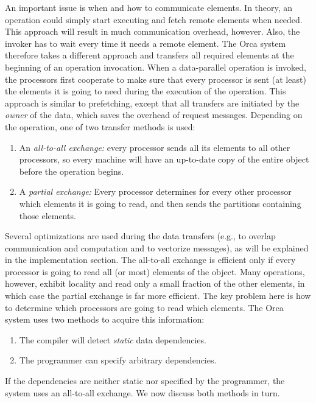 \documentclass{acmtrans2e}
\begin{document}
An important issue is when and how to communicate elements.
In theory, an operation could simply start executing and
fetch remote elements when needed. This approach will
result in much communication overhead, however.
Also, the invoker has to wait every time it needs a remote element.
The Orca system therefore takes a different approach and transfers
all required elements at the beginning of an operation invocation.
When a data-parallel operation is invoked, the processors first cooperate 
to make sure that every processor is sent (at least) the elements it 
is going to need during the execution of the operation.
This approach is similar to prefetching, except that
all transfers are initiated by the \emph{owner} of the data,
which saves the overhead of request messages.
Depending on the operation, one of two transfer methods is used:


\begin{enumerate}
\item An \emph{all-to-all exchange:} every processor sends all its elements
to all other processors,
so every machine will have an up-to-date copy of the entire object before
the operation begins.

\item A \emph{partial exchange:} Every processor determines for every
other processor
which elements it is going to read, and then sends the partitions
containing those elements.

\end{enumerate}

Several optimizations are used during the data transfers (e.g., to
overlap communication and computation and to vectorize messages), as
will be explained in the implementation section.
The all-to-all exchange is efficient only if every
processor is going to read all (or most) elements of the object.
Many operations, however, exhibit locality and read only a small fraction
of the other elements, in which case the partial exchange is far more efficient.
The key problem here is how to determine which processors are
going to read which elements.
The Orca system uses two methods to acquire this information:

\begin{enumerate}
\item The compiler will detect \emph{static} data dependencies.
\item The programmer can specify arbitrary dependencies.
\end{enumerate}

If the dependencies are neither static nor specified by the programmer,
the system uses an all-to-all exchange. We now discuss both methods in turn.
\end{document}
